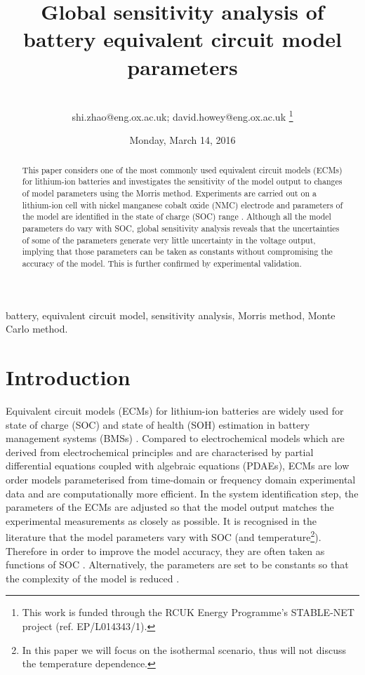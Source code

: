 \documentclass[letterpaper,twocolumn]{IEEEtran}
\author{\IEEEauthorblockN{Shi Zhao and David A. Howey \\}
\IEEEauthorblockA{
Department~of~Engineering~Science\\
University~of~Oxford\\
Oxford, United~Kingdom}\\
shi.zhao@eng.ox.ac.uk; david.howey@eng.ox.ac.uk
\thanks{This work is funded through the RCUK Energy Programme's STABLE-NET project (ref. EP/L014343/1).}}
\title{Global sensitivity analysis of battery equivalent circuit model parameters}
\date{Monday, March 14, 2016}
\begin{document}
\maketitle
\begin{abstract}
This paper considers one of the most commonly used equivalent circuit models (ECMs) for lithium-ion batteries and investigates the sensitivity of the model output to changes of model parameters using the Morris method. Experiments are carried out on a lithium-ion cell with nickel manganese cobalt oxide (NMC) electrode and parameters of the model are identified in the state of charge (SOC) range . Although all the model parameters do vary with SOC, global sensitivity analysis reveals that the uncertainties of some of the parameters generate very little uncertainty in the voltage output, implying that those parameters can be taken as constants without compromising the accuracy of the model. This is further confirmed by experimental validation.
\end{abstract}

\begin{IEEEkeywords}
battery, equivalent circuit model, sensitivity analysis, Morris method, Monte Carlo method.
\end{IEEEkeywords}

\section{Introduction}
Equivalent circuit models (ECMs) for lithium-ion batteries are widely used for state of charge (SOC) and state of health (SOH) estimation in battery management systems (BMSs) \cite{hu2012comparative}. Compared to electrochemical models which are derived from electrochemical principles and are characterised by partial differential equations coupled with algebraic equations (PDAEs), ECMs are low order models parameterised from time-domain or frequency domain experimental data and are computationally more efficient. In the system identification step, the parameters of the ECMs are adjusted so that the model output matches the experimental measurements as closely as possible. It is recognised in the literature that the model parameters vary with SOC (and temperature\footnote{In this paper we will focus on the isothermal scenario, thus will not discuss the temperature dependence.}). Therefore in order to improve the model accuracy, they are often taken as functions of SOC \cite{hu2012robustness}. Alternatively, the parameters are set to be constants so that the complexity of the model is reduced \cite{zhao2015observability}.
\end{document}
